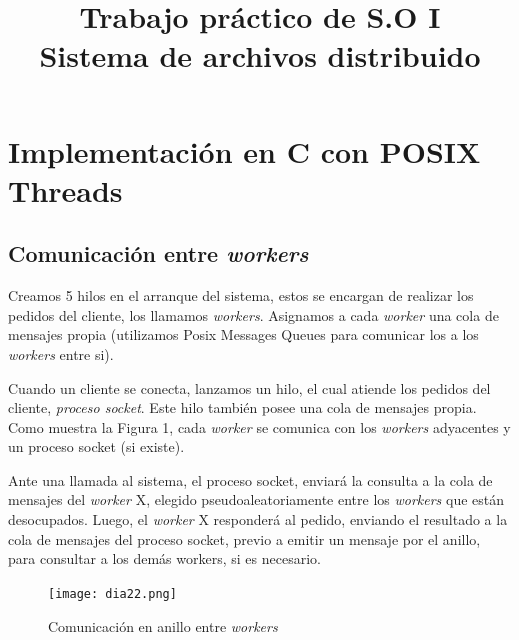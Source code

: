 \documentclass[a4paper, 8pt]{article}
\title{Trabajo práctico de S.O I \\ Sistema de archivos distribuido}
\begin{document}
\maketitle

\section{Implementación en C con POSIX Threads}

\subsection{Comunicación entre \textit{workers}}

Creamos 5 hilos en el arranque del sistema, estos se encargan de realizar los pedidos del cliente, los llamamos \textit{workers}.
Asignamos a cada \textit{worker} una cola de mensajes propia (utilizamos Posix Messages Queues para comunicar los a los \textit{workers} entre si).

Cuando un cliente se conecta, lanzamos un hilo, el cual atiende los pedidos del cliente, \textit{proceso socket}.
Este hilo también posee una cola de mensajes propia.
Como muestra la Figura 1, cada \textit{worker} se comunica con los \textit{workers} adyacentes y un proceso socket (si existe).


Ante una llamada al sistema, el proceso socket, enviará la consulta a la cola de mensajes del \textit{worker} X, elegido pseudoaleatoriamente
entre los \textit{workers} que están desocupados.
Luego, el \textit{worker} X responderá al pedido, enviando el resultado a la cola de mensajes del proceso socket,
previo a emitir un mensaje por el anillo, para consultar a los demás workers, si es necesario.


 \begin{figure}[htbp]
   \centering
     \texttt{[image: dia22.png]}
     \caption{Comunicación en anillo entre \textit{workers}}
   \label{Figura 1}
 \end{figure}
\end{document}
